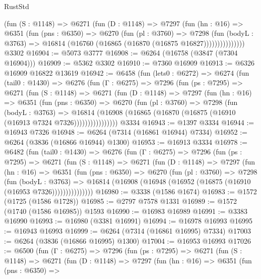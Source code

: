 \begin{lexlean}{RustStd}
\begin{coremodule}
              (fun (S : @1148) =>
              @6271
                (fun (D : @1148) =>
                @7297
                  (fun (hn : @16) =>
                  @6351
                    (fun (pns : @6350) =>
                    @6270
                      (fun (pl : @3760) =>
                      @7298
                        (fun (bodyL : @3763) =>
                        @16814 (@16760 (@16865 (@16870 (@16875 @16827)))))))))))))))
    @3302
@16904 := @5073 @3777
@16908 := @6264 (@16758 (@3847 (@7304 @16904)))
@16909 := @5362 @3302
@16910 := @7360 @16909
@16913 := @6326 @16909 @16822 @13619
@16942 := @6458
    (fun (lets0 : @6272) =>
    @6274
      (fun (tail0 : @1430) =>
      @6276
        (fun (Γ : @6275) =>
        @7296
          (fun (ps : @7295) =>
          @6271
            (fun (S : @1148) =>
            @6271
              (fun (D : @1148) =>
              @7297
                (fun (hn : @16) =>
                @6351
                  (fun (pns : @6350) =>
                  @6270
                    (fun (pl : @3760) =>
                    @7298
                      (fun (bodyL : @3763) =>
                      @16814
                        (@16908 (@16865 (@16870 (@16875 (@16910 (@16913 @7324 @7326))))))))))))))))
    @3334
@16943 := @1397 @3334
@16944 := @16943 @7326
@16948 := @6264 (@7314 (@16861 @16944) @7334)
@16952 := @6264 (@3836 (@16866 @16944) @1300)
@16953 := @16913 @3334
@16978 := @6482
    (fun (tail0 : @1430) =>
    @6276
      (fun (Γ : @6275) =>
      @7296
        (fun (ps : @7295) =>
        @6271
          (fun (S : @1148) =>
          @6271
            (fun (D : @1148) =>
            @7297
              (fun (hn : @16) =>
              @6351
                (fun (pns : @6350) =>
                @6270
                  (fun (pl : @3760) =>
                  @7298
                    (fun (bodyL : @3763) =>
                    @16814 (@16908 (@16948 (@16952 (@16875 (@16910 (@16953 @7326)))))))))))))))
@16980 := @3338 (@1586 @1674)
@16983 := @1572 (@1725 (@1586 @1728))
@16985 := @2797 @7578 @1331
@16989 := @1572 (@1740 (@1586 @16985)) @1593
@16990 := @16983 @16989
@16991 := @3383 @16990
@16993 := @16980 (@3381 @16991)
@16994 := @16978 @16993
@16995 := @16943 @16993
@16999 := @6264 (@7314 (@16861 @16995) @7334)
@17003 := @6264 (@3836 (@16866 @16995) @1300)
@17004 := @16953 @16993
@17026 := @6500
    (fun (Γ : @6275) =>
    @7296
      (fun (ps : @7295) =>
      @6271
        (fun (S : @1148) =>
        @6271
          (fun (D : @1148) =>
          @7297
            (fun (hn : @16) =>
            @6351
              (fun (pns : @6350) =>

\end{coremodule}
\end{lexlean}
